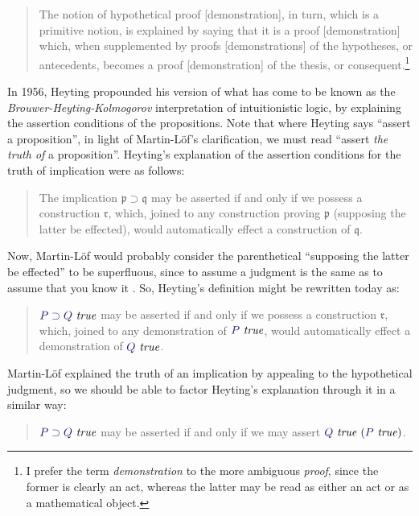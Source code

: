 \documentclass[11pt]{amsart}
\theoremstyle{definition}
\theoremstyle{remark}
\numberwithin{equation}{section}
\def\InputModeColorName{MidnightBlue}
\newcommand\InputMode[1]{{\color{\InputModeColorName}{#1}}}
\newcommand\HypJ[2]{#1\ (#2)}
\newcommand\IsTrue[1]{\InputMode{#1}\ \mathit{true}}
\newcommand\Imp[2]{#1\supset #2}
\begin{document}
\begin{quote}
  The notion of hypothetical proof [demonstration], in turn, which is a
primitive notion, is explained by saying that it is a proof [demonstration]
which, when supplemented by proofs [demonstrations] of the hypotheses, or
antecedents, becomes a proof [demonstration] of the thesis, or
consequent.\footnote{
I prefer the term \emph{demonstration} to the more ambiguous \emph{proof}, since
the former is clearly an act, whereas the latter may be read as either an act or
as a mathematical object.
}
\cite{siena.lectures}
\end{quote}


In 1956, Heyting propounded his version of what has come to be known as the
\emph{Brouwer-Heyting-Kolmogorov} interpretation of intuitionistic logic, by
explaining the assertion conditions of the propositions. Note that where Heyting
says ``assert a proposition'', in light of Martin-L\"of's clarification, we must
read ``assert \emph{the truth of} a proposition''. Heyting's explanation
of the assertion conditions for the truth of implication were as follows:
\begin{quote}
  The implication $\Imp{\mathfrak{p}}{\mathfrak{q}}$ may be asserted if and only
if we possess a construction $\mathfrak{r}$, which, joined to any construction
proving $\mathfrak{p}$ (supposing the latter be effected), would automatically
effect a construction of $\mathfrak{q}$. \cite{HeytingA:int}
\end{quote}

Now, Martin-L\"of would probably consider the parenthetical ``supposing the
latter be effected'' to be superfluous, since to assume a judgment is the same
as to assume that you know it \cite{siena.lectures}.
So, Heyting's definition might be rewritten today as:

\begin{quote}
$\IsTrue{\Imp{P}{Q}}$ may be asserted if and only if we
possess a construction $\mathfrak{r}$, which, joined to any demonstration of $\IsTrue{P}$,
would automatically effect a demonstration of $\IsTrue{Q}$.
\end{quote}

Martin-L\"of explained the truth of an implication by appealing to the
hypothetical judgment, so we should be able to factor Heyting's explanation
through it in a similar way:

\begin{quote}
  $\IsTrue{\Imp{P}{Q}}$ may be asserted if and only if we may assert $\HypJ{\IsTrue{Q}}{\IsTrue{P}}$.
\end{quote}
\end{document}

